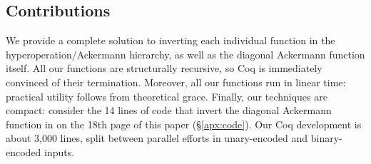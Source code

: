 \subsection{Contributions}
We provide a complete solution to inverting each individual function in the hyperoperation/Ackermann hierarchy,
as well as the diagonal Ackermann function itself.  All our functions are structurally recursive, so
Coq is immediately convinced of their termination.  Moreover, all our functions run in linear time: practical utility follows from theoretical grace.
Finally, our techniques are compact: consider the 14 lines of code that invert the diagonal Ackermann function in  on the 18th page of this paper (\S\ref{apx:code}).  Our Coq development is about 3,000 lines, split between parallel efforts in unary-encoded and binary-encoded inputs.
